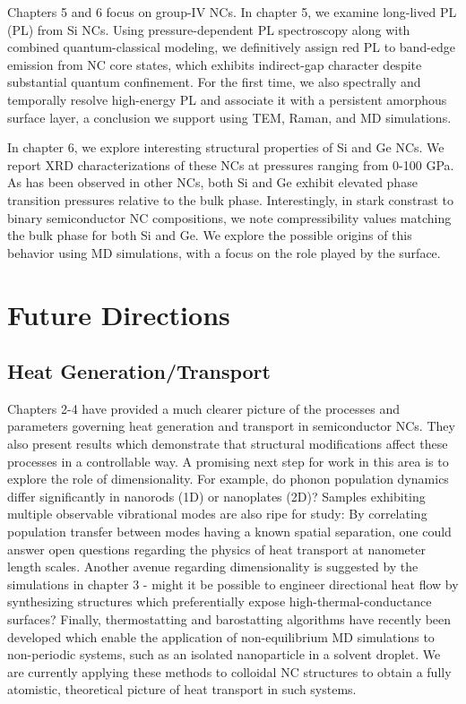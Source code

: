 Chapters 5 and 6 focus on group-IV NCs. In chapter 5, we examine long-lived PL (PL) from Si NCs. Using pressure-dependent PL spectroscopy along with combined quantum-classical modeling, we definitively assign red PL to band-edge emission from NC core states, which exhibits indirect-gap character despite substantial quantum confinement. For the first time, we also spectrally and temporally resolve high-energy PL and associate it with a persistent amorphous surface layer, a conclusion we support using TEM, Raman, and MD simulations. \par
In chapter 6, we explore interesting structural properties of Si and Ge NCs. We report XRD characterizations of these NCs at pressures ranging from 0-100 GPa. As has been observed in other NCs, both Si and Ge exhibit elevated phase transition pressures relative to the bulk phase. Interestingly, in stark constrast to binary semiconductor NC compositions, we note compressibility values matching the bulk phase for both Si and Ge. We explore the possible origins of this behavior using MD simulations, with a focus on the role played by the surface.

\section{Future Directions}

\subsection{Heat Generation/Transport}
Chapters 2-4 have provided a much clearer picture of the processes and parameters governing heat generation and transport in semiconductor NCs. They also present results which demonstrate that structural modifications affect these processes in a controllable way. A promising next step for work in this area is to explore the role of dimensionality. For example, do phonon population dynamics differ significantly in nanorods (1D) or nanoplates (2D)? Samples exhibiting multiple observable vibrational modes are also ripe for study: By correlating population transfer between modes having a known spatial separation, one could answer open questions regarding the physics of heat transport at nanometer length scales. Another avenue regarding dimensionality is suggested by the simulations in chapter 3 - might it be possible to engineer directional heat flow by synthesizing structures which preferentially expose high-thermal-conductance surfaces? Finally, thermostatting and barostatting algorithms have recently been developed which enable the application of non-equilibrium MD simulations to non-periodic systems, such as an isolated nanoparticle in a solvent droplet. We are currently applying these methods to colloidal NC structures to obtain a fully atomistic, theoretical picture of heat transport in such systems.

